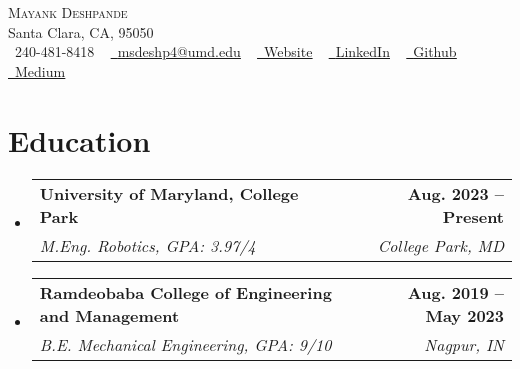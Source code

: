 \documentclass[letterpaper,10pt]{article}
\makeatletter
\newcommand{\resumeSubheading}[4]{
  \vspace{-2pt}\item
    \begin{tabular*}{1.0\textwidth}[t]{l@{\extracolsep{\fill}}r}
      \textbf{#1} & \textbf{\small #2} \\
      \textit{\small#3} & \textit{\small #4} \\
    \end{tabular*}\vspace{-7pt}
}
\newcommand{\resumeSubHeadingListStart}{\begin{itemize}[leftmargin=0.0in, label={}]}
\newcommand{\resumeSubHeadingListEnd}{\end{itemize}}
\makeatother
\begin{document}

\begin{center}
    {\Huge \scshape Mayank Deshpande} \\ \vspace{1pt}
    Santa Clara, CA, 95050 \\ \vspace{1pt}
    \small \raisebox{-0.1\height}\faPhone\ 240-481-8418 ~ \href{mailto:x@gmail.com}{\raisebox{-0.2\height}\faEnvelope\  \underline{msdeshp4@umd.edu}} ~ 
    \href{https://mayankd.me/}{\raisebox{-0.2\height}\faLink\ \underline{Website}}  ~
    \href{https://www.linkedin.com/in/msdeshpande04/}{\raisebox{-0.2\height}\faLinkedin\ \underline{LinkedIn}}  ~
    \href{https://github.com/MayankD409}{\raisebox{-0.2\height}\faGithub\ \underline{Github}} ~
    \href{https://medium.com/@deshpandemayank5}{\raisebox{-0.2\height}\faMedium\ \underline{Medium}}
    \vspace{-8pt}
\end{center}


\section{Education}
  \resumeSubHeadingListStart
    \resumeSubheading
      {University of Maryland, College Park}{Aug. 2023 -- Present}
      {M.Eng. Robotics, GPA: 3.97/4}{College Park, MD}
    \resumeSubheading
      {Ramdeobaba College of Engineering and Management}{Aug. 2019 -- May 2023}
      {B.E. Mechanical Engineering, GPA: 9/10}{Nagpur, IN}
  \resumeSubHeadingListEnd
\end{document}
